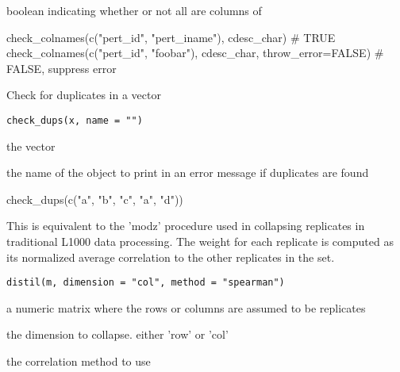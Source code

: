 \documentclass[letterpaper]{book}
\begin{document}
%
\begin{Value}
boolean indicating whether or not all  are
columns of 
\end{Value}
%
\begin{Examples}
\begin{ExampleCode}
check_colnames(c("pert_id", "pert_iname"), cdesc_char)            # TRUE
check_colnames(c("pert_id", "foobar"), cdesc_char, throw_error=FALSE) # FALSE, suppress error
\end{ExampleCode}
\end{Examples}
%
\begin{Description}\relax
Check for duplicates in a vector
\end{Description}
%
\begin{Usage}
\begin{verbatim}
check_dups(x, name = "")
\end{verbatim}
\end{Usage}
%
\begin{Arguments}
\begin{ldescription}
\item[\code{x}] the vector

\item[\code{name}] the name of the object to print
in an error message if duplicates are found
\end{ldescription}
\end{Arguments}
%
\begin{Examples}
\begin{ExampleCode}
check_dups(c("a", "b", "c", "a", "d"))
\end{ExampleCode}
\end{Examples}
%
\begin{Description}\relax
This is equivalent to the 'modz' procedure
used in collapsing replicates in traditional L1000
data processing. The weight for each replicate is
computed as its normalized average correlation to
the other replicates in the set.
\end{Description}
%
\begin{Usage}
\begin{verbatim}
distil(m, dimension = "col", method = "spearman")
\end{verbatim}
\end{Usage}
%
\begin{Arguments}
\begin{ldescription}
\item[\code{m}] a numeric matrix where the rows or columns are
assumed to be replicates

\item[\code{dimension}] the dimension to collapse. either 'row'
or 'col'

\item[\code{method}] the correlation method to use
\end{ldescription}
\end{Arguments}
\end{document}
